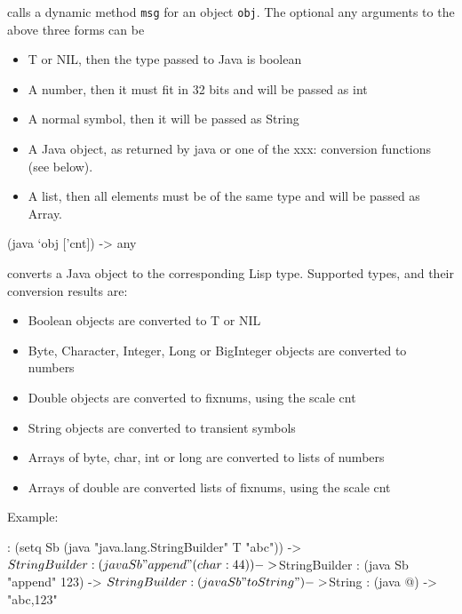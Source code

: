 calls a dynamic method \texttt{msg} for an object \texttt{obj}. The
optional any arguments to the above three forms can be

\begin{itemize}
\item T or NIL, then the type passed to Java is boolean
\item A number, then it must fit in 32 bits and will be passed as int
\item A normal symbol, then it will be passed as String
\item A Java object, as returned by java or one of the xxx: conversion
   functions (see below).
\item A list, then all elements must be of the same type and will be passed
   as Array.
\end{itemize}


\begin{wideverbatim}
(java `obj ['cnt]) -> any
\end{wideverbatim}

converts a Java object to the corresponding Lisp type. Supported
types, and their conversion results are:

\begin{itemize}
\item Boolean objects are converted to T or NIL
\item Byte, Character, Integer, Long or BigInteger objects are converted to
   numbers
\item Double objects are converted to fixnums, using the scale cnt
\item String objects are converted to transient symbols
\item Arrays of byte, char, int or long are converted to lists of numbers
\item Arrays of double are converted lists of fixnums, using the scale cnt
\end{itemize}

Example:

\begin{wideverbatim}
: (setq Sb (java "java.lang.StringBuilder" T "abc"))
-> $StringBuilder
: (java Sb "append" (char: 44))
-> $StringBuilder
: (java Sb "append" 123)
-> $StringBuilder
: (java Sb "toString")
-> $String
: (java @)
-> "abc,123"
\end{wideverbatim}




